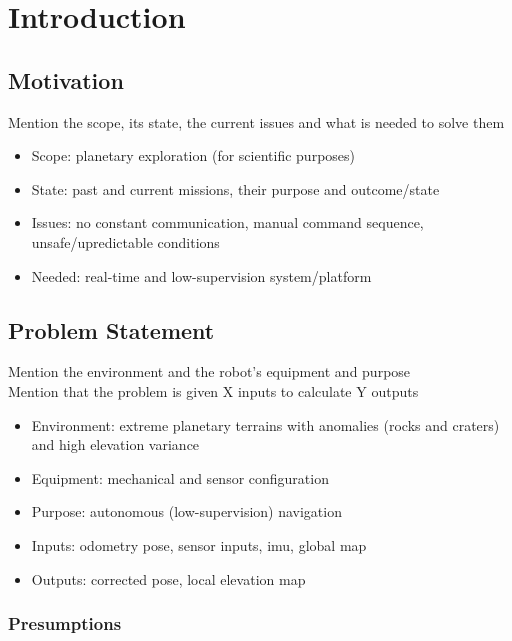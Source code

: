 \label{Chapter1}

\chapter{Introduction}

\section{Motivation}

Mention the scope, its state, the current issues and what is needed to
solve them

\begin{itemize}
    \item Scope: planetary exploration (for scientific purposes)
    \item State: past and current missions, their purpose and outcome/state
    \item Issues: no constant communication, manual command sequence, unsafe/upredictable conditions
    \item Needed: real-time and low-supervision system/platform
\end{itemize}

\section{Problem Statement}


Mention the environment and the robot's equipment and purpose\\
Mention that the problem is given X inputs to calculate Y outputs

\begin{itemize}
    \item Environment: extreme planetary terrains with anomalies (rocks and craters) and high elevation variance
    \item Equipment: mechanical and sensor configuration
    \item Purpose: autonomous (low-supervision) navigation
    \item Inputs: odometry pose, sensor inputs, imu, global map
    \item Outputs: corrected pose, local elevation map
\end{itemize}

\subsection{Presumptions}

